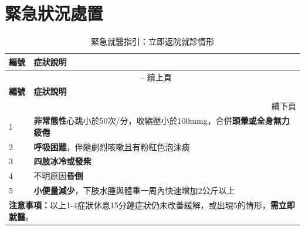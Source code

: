 \documentclass[nols]{tufte-book}
\begin{document}
\chapter{緊急狀況處置}
\begin{longtable}{|p{}|p{}|}
\caption{緊急就醫指引：立即返院就診情形} \label{tab:emergency-signs} \\
\hline
\textbf{編號} & \textbf{症狀說明} \\
\hline
\endfirsthead

\multicolumn{2}{c}{\tablename\ \thetable{} -- 續上頁} \\
\hline
\textbf{編號} & \textbf{症狀說明} \\
\hline
\endhead

\hline
\multicolumn{2}{r}{續下頁} \\
\endfoot

\hline
\endlastfoot

1 & \textbf{非常態性}心跳小於50次/分，收縮壓小於100mmg，合併\textbf{頭暈或全身無力疲倦} \\
\hline

2 & \textbf{呼吸困難}，伴隨劇烈咳嗽且有粉紅色泡沫痰 \\
\hline

3 & \textbf{四肢冰冷或發紫} \\
\hline

4 & 不明原因\textbf{昏倒} \\
\hline

5 & \textbf{小便量減少}，下肢水腫與體重一周內快速增加2公斤以上 \\
\hline

\multicolumn{2}{|p{\textwidth}|}{\textbf{注意事項：}以上1-4症狀休息15分鐘症狀仍未改善緩解，或出現5的情形，\textbf{需立即就醫}。} \\

\end{longtable}


%
%
\end{document}
